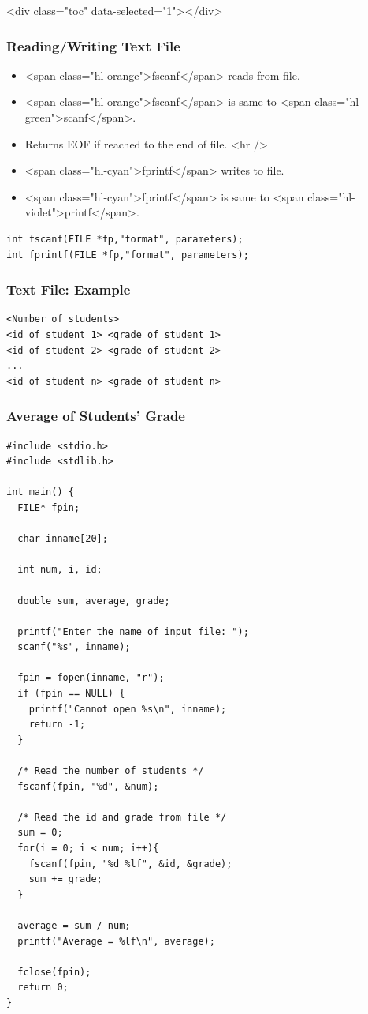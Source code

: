 \documentclass{../c-lecture}
\begin{document}
\begin{frame}
  <div class="toc" data-selected="1"></div>
\end{frame}

\begin{frame}
  \frametitle{Reading/Writing Text File}
  \begin{itemize}
    \item <span class="hl-orange">fscanf</span> reads from file.
    \item
      <span class="hl-orange">fscanf</span> is same to
      <span class="hl-green">scanf</span>.

    \item Returns EOF if reached to the end of file.
    <hr />
    \item <span class="hl-cyan">fprintf</span> writes to file.
    \item
      <span class="hl-cyan">fprintf</span> is same to
      <span class="hl-violet">printf</span>.

  \end{itemize}
  \begin{verbatim}
int fscanf(FILE *fp,"format", parameters);
int fprintf(FILE *fp,"format", parameters);
  \end{verbatim}
\end{frame}
\begin{frame}
  \frametitle{Text File: Example}
  \begin{verbatim}
<Number of students>
<id of student 1> <grade of student 1>
<id of student 2> <grade of student 2>
...
<id of student n> <grade of student n>
  \end{verbatim}
\end{frame}
\begin{frame}
  \frametitle{Average of Students' Grade}
  \begin{verbatim}
#include <stdio.h>
#include <stdlib.h>

int main() {
  FILE* fpin;

  char inname[20];

  int num, i, id;

  double sum, average, grade;

  printf("Enter the name of input file: ");
  scanf("%s", inname);

  fpin = fopen(inname, "r");
  if (fpin == NULL) {
    printf("Cannot open %s\n", inname);
    return -1;
  }

  /* Read the number of students */
  fscanf(fpin, "%d", &num);

  /* Read the id and grade from file */
  sum = 0;
  for(i = 0; i < num; i++){
    fscanf(fpin, "%d %lf", &id, &grade);
    sum += grade;
  }

  average = sum / num;
  printf("Average = %lf\n", average);

  fclose(fpin);
  return 0;
}
  \end{verbatim}
\end{frame}
\end{document}
